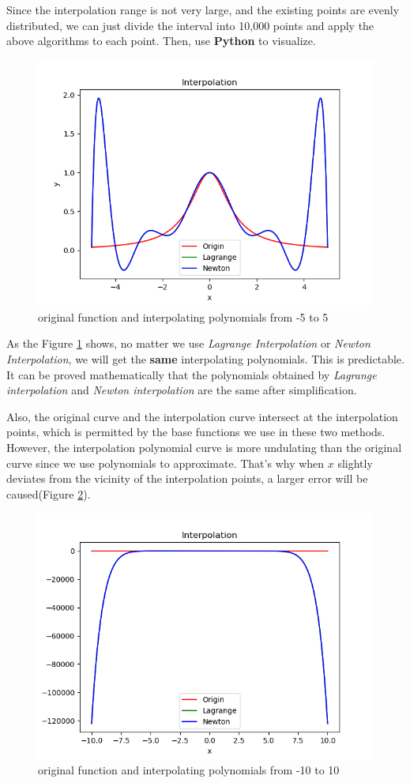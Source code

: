 \documentclass[a4paper]{article}
\begin{document}
Since the interpolation range is not very large, and the existing points are evenly distributed, we can just divide the interval into 10,000 points and apply the above algorithms to each point. Then, use \textbf{Python} to visualize.

\begin{figure}[!h]
    \centering
    \includegraphics[width=.6\textwidth]{./figures/Figure_1.png}
    \caption{original function and interpolating polynomials from -5 to 5}
    \label{fig:Figure_1}
\end{figure}
As the Figure \ref{fig:Figure_1} shows, no matter we use \emph{Lagrange Interpolation} or \emph{Newton Interpolation}, we will get the \textbf{same} interpolating polynomials.
This is predictable.
It can be proved mathematically that the polynomials obtained by \emph{Lagrange interpolation} and \emph{Newton interpolation} are the same after simplification.

Also, the original curve and the interpolation curve intersect at the interpolation points, which is permitted by the base functions we use in these two methods.
However, the interpolation polynomial curve is more undulating than the original curve since we use polynomials to approximate.
That's why when $x$ slightly deviates from the vicinity of the interpolation points, a larger error will be caused(Figure \ref{fig:Figure_2}).
\begin{figure}[!h]
    \centering
    \includegraphics[width=.6\textwidth]{./figures/Figure_2.png}
    \caption{original function and interpolating polynomials from -10 to 10}
    \label{fig:Figure_2}
\end{figure}
\end{document}
